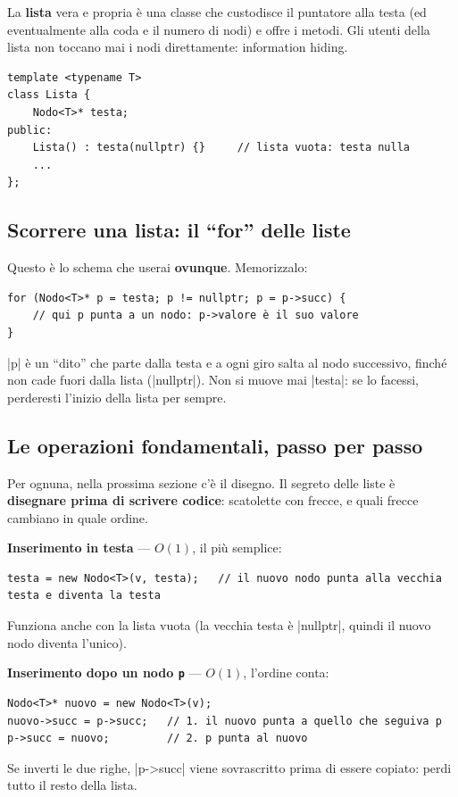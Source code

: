 La \textbf{lista} vera e propria è una classe che custodisce il puntatore alla testa
(ed eventualmente alla coda e il numero di nodi) e offre i metodi. Gli utenti della
lista non toccano mai i nodi direttamente: information hiding.
\begin{lstlisting}
template <typename T>
class Lista {
    Nodo<T>* testa;
public:
    Lista() : testa(nullptr) {}     // lista vuota: testa nulla
    ...
};
\end{lstlisting}

\subsection*{Scorrere una lista: il ``for'' delle liste}

Questo è lo schema che userai \textbf{ovunque}. Memorizzalo:
\begin{lstlisting}
for (Nodo<T>* p = testa; p != nullptr; p = p->succ) {
    // qui p punta a un nodo: p->valore è il suo valore
}
\end{lstlisting}
\cc|p| è un ``dito'' che parte dalla testa e a ogni giro salta al nodo successivo, finché
non cade fuori dalla lista (\cc|nullptr|). Non si muove mai \cc|testa|: se lo facessi,
perderesti l'inizio della lista per sempre.

\subsection*{Le operazioni fondamentali, passo per passo}

Per ognuna, nella prossima sezione c'è il disegno. Il segreto delle liste è
\textbf{disegnare prima di scrivere codice}: scatolette con frecce, e quali frecce
cambiano in quale ordine.

\textbf{Inserimento in testa} --- $O(1)$, il più semplice:
\begin{lstlisting}
testa = new Nodo<T>(v, testa);   // il nuovo nodo punta alla vecchia testa e diventa la testa
\end{lstlisting}
Funziona anche con la lista vuota (la vecchia testa è \cc|nullptr|, quindi il nuovo
nodo diventa l'unico).

\textbf{Inserimento dopo un nodo \texttt{p}} --- $O(1)$, l'ordine conta:
\begin{lstlisting}
Nodo<T>* nuovo = new Nodo<T>(v);
nuovo->succ = p->succ;   // 1. il nuovo punta a quello che seguiva p
p->succ = nuovo;         // 2. p punta al nuovo
\end{lstlisting}
Se inverti le due righe, \cc|p->succ| viene sovrascritto prima di essere copiato: perdi
tutto il resto della lista.

